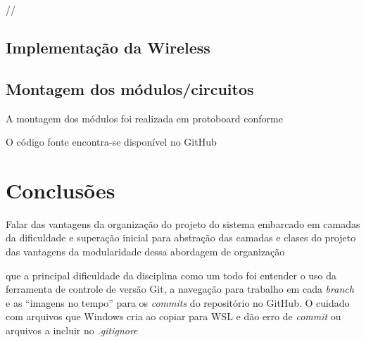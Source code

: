 \documentclass[10pt,twocolumn,letterpaper]{article}
\begin{document}
//\subsection[short]{Implementação da Wireless}

\subsection[short]{Montagem dos módulos/circuitos}
A montagem dos módulos foi realizada em protoboard conforme 

O código fonte encontra-se disponível no GitHub \cite{src-github}

\section{Conclusões}
Falar 
das vantagens da organização do projeto do sistema embarcado em camadas
da dificuldade e superação inicial para abstração das camadas e clases do projeto
das vantagens da modularidade dessa abordagem de organização

que a principal dificuldade da disciplina como um todo foi entender o uso da ferramenta de 
controle de versão Git, a navegação para trabalho em cada \emph{branch} e as ``imagens no tempo''
para os \emph{commits} do repositório no GitHub. O cuidado com arquivos que Windows cria ao copiar para WSL e dão erro de \emph{commit} ou arquivos a incluir no \emph{.gitignore}
\end{document}

